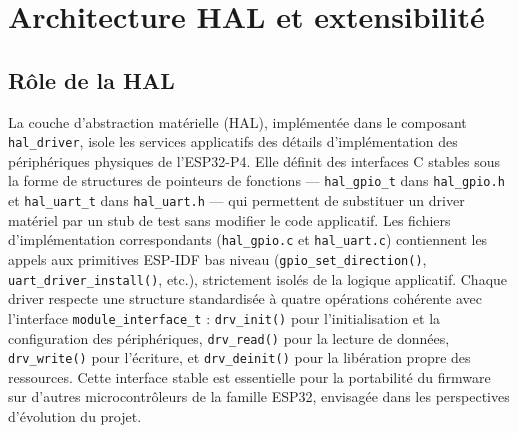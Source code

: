 \section{Architecture HAL et extensibilité}
\label{sec:hal}

\subsection{Rôle de la HAL}
\label{subsec:hal_role}

La couche d'abstraction matérielle (HAL), implémentée dans le composant
\texttt{hal\_driver}, isole les services applicatifs des détails
d'implémentation des périphériques physiques de l'ESP32-P4. Elle
définit des interfaces C stables sous la forme de structures de
pointeurs de fonctions — \texttt{hal\_gpio\_t} dans \texttt{hal\_gpio.h}
et \texttt{hal\_uart\_t} dans \texttt{hal\_uart.h} — qui permettent
de substituer un driver matériel par un stub de test sans modifier
le code applicatif. Les fichiers d'implémentation correspondants
(\texttt{hal\_gpio.c} et \texttt{hal\_uart.c}) contiennent les appels
aux primitives ESP-IDF bas niveau (\texttt{gpio\_set\_direction()},
\texttt{uart\_driver\_install()}, etc.), strictement isolés de la
logique applicatif. Chaque driver respecte une structure standardisée
à quatre opérations cohérente avec l'interface
\texttt{module\_interface\_t} : \texttt{drv\_init()} pour
l'initialisation et la configuration des périphériques, \texttt{drv\_read()}
pour la lecture de données, \texttt{drv\_write()} pour l'écriture,
et \texttt{drv\_deinit()} pour la libération propre des ressources.
Cette interface stable est essentielle pour la portabilité du firmware
sur d'autres microcontrôleurs de la famille ESP32, envisagée dans
les perspectives d'évolution du projet.

